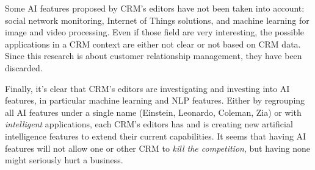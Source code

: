 Some AI features proposed by CRM's editors have not been taken into account: social network monitoring, Internet of Things solutions, and machine learning for image and video processing. Even if those field are very interesting, the possible applications in a CRM context are either not clear or not based on CRM data. Since this research is about customer relationship management, they have been discarded.

Finally, it's clear that CRM's editors are investigating and investing into AI features, in particular machine learning and NLP features. Either by regrouping all AI features under a single name (Einstein, Leonardo, Coleman, Zia) or with \textit{intelligent} applications, each CRM's editors has and is creating new artificial intelligence features to extend their current capabilities. It seems that having AI features will not allow one or other CRM to \textit{kill the competition}, but having none might seriously hurt a business.